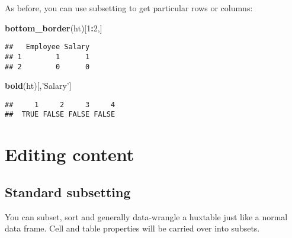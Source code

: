 \documentclass[]{article}
\newenvironment{Shaded}{\begin{snugshade}}{\end{snugshade}}
\newcommand{\CommentTok}[1]{\textcolor[rgb]{0.56,0.35,0.01}{\textit{#1}}}
\newcommand{\DataTypeTok}[1]{\textcolor[rgb]{0.13,0.29,0.53}{#1}}
\newcommand{\DecValTok}[1]{\textcolor[rgb]{0.00,0.00,0.81}{#1}}
\newcommand{\KeywordTok}[1]{\textcolor[rgb]{0.13,0.29,0.53}{\textbf{#1}}}
\newcommand{\NormalTok}[1]{#1}
\newcommand{\OperatorTok}[1]{\textcolor[rgb]{0.81,0.36,0.00}{\textbf{#1}}}
\newcommand{\StringTok}[1]{\textcolor[rgb]{0.31,0.60,0.02}{#1}}
\begin{document}
\FloatBarrier

As before, you can use subsetting to get particular rows or columns:

\begin{Shaded}
\begin{Highlighting}[]
\KeywordTok{bottom_border}\NormalTok{(ht)[}\DecValTok{1}\OperatorTok{:}\DecValTok{2}\NormalTok{,]}
\end{Highlighting}
\end{Shaded}

\begin{verbatim}
##   Employee Salary
## 1        1      1
## 2        0      0
\end{verbatim}

\begin{Shaded}
\begin{Highlighting}[]
\KeywordTok{bold}\NormalTok{(ht)[,}\StringTok{'Salary'}\NormalTok{]}
\end{Highlighting}
\end{Shaded}

\begin{verbatim}
##     1     2     3     4 
##  TRUE FALSE FALSE FALSE
\end{verbatim}

\FloatBarrier

\hypertarget{editing-content}{%
\section{Editing content}\label{editing-content}}

\hypertarget{standard-subsetting}{%
\subsection{Standard subsetting}\label{standard-subsetting}}

You can subset, sort and generally data-wrangle a huxtable just like a
normal data frame. Cell and table properties will be carried over into
subsets.

\begin{Shaded}
\end{Shaded}
\end{document}
